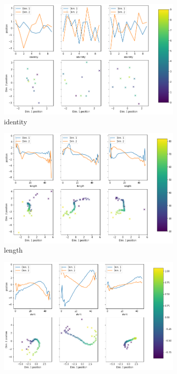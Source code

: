 \begin{figure}[H]
\begin{subfigure}{.48\textwidth}
        \includegraphics[width=\textwidth]{images/latent_space_traversals/vlae_gan_mnist_morpho_latent_space_values_identity.png}
        \caption{identity}
    \end{subfigure}
    \hfill
    \begin{subfigure}{.48\textwidth}
        \includegraphics[width=\textwidth]{images/latent_space_traversals/vlae_gan_mnist_morpho_latent_space_values_length.png}
        \caption{length}
    \end{subfigure}
    \begin{subfigure}{.48\textwidth}
        \includegraphics[width=\textwidth]{images/latent_space_traversals/vlae_gan_mnist_morpho_latent_space_values_slant.png}

\end{subfigure}
\end{figure}
